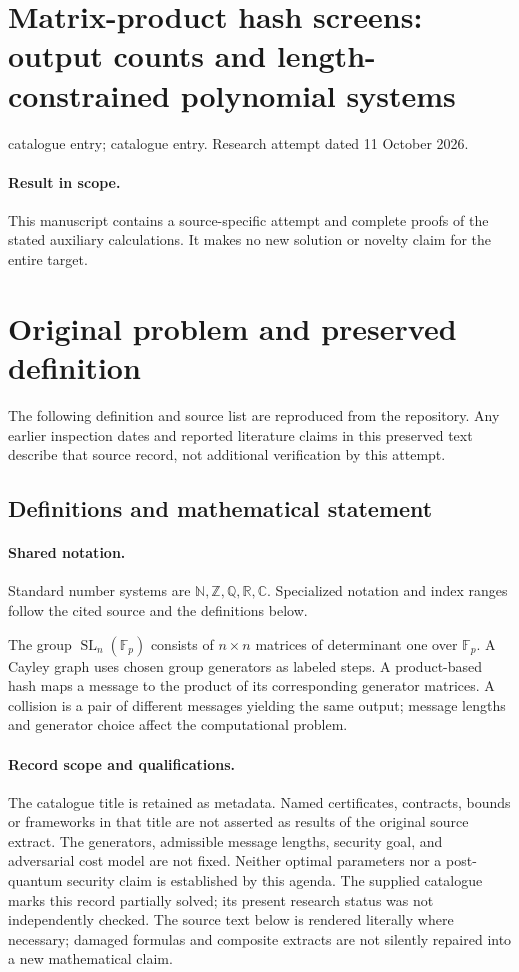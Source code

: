 \documentclass[11pt]{article}
\begin{document}
\section*{Matrix-product hash screens: output counts and length-constrained polynomial systems}
\noindent catalogue entry; catalogue entry. Research attempt dated 11 October 2026.
\paragraph{Result in scope.}This manuscript contains a source-specific attempt and complete proofs of the stated auxiliary calculations. It makes no new solution or novelty claim for the entire target.
\section{Original problem and preserved definition}
The following definition and source list are reproduced from the repository. Any earlier inspection dates and reported literature claims in this preserved text describe that source record, not additional verification by this attempt.
\subsection{Definitions and mathematical statement}

\paragraph{Shared notation.}Standard number systems are $\mathbb N,\mathbb Z,\mathbb Q,\mathbb R,\mathbb C$. Specialized notation and index ranges follow the cited source and the definitions below.


The group $\operatorname{SL}_n(\mathbb F_p)$ consists of $n\times n$ matrices of determinant one over $\mathbb F_p$. A Cayley graph uses chosen group generators as labeled steps. A product-based hash maps a message to the product of its corresponding generator matrices. A collision is a pair of different messages yielding the same output; message lengths and generator choice affect the computational problem.
\paragraph{Record scope and qualifications.}
The catalogue title is retained as metadata. Named certificates, contracts, bounds or frameworks in that title are not asserted as results of the original source extract.
The generators, admissible message lengths, security goal, and adversarial cost model are not fixed. Neither optimal parameters nor a post-quantum security claim is established by this agenda. The supplied catalogue marks this record partially solved; its present research status was not independently checked.
The source text below is rendered literally where necessary; damaged formulas and composite extracts are not silently repaired into a new mathematical claim.
\end{document}
